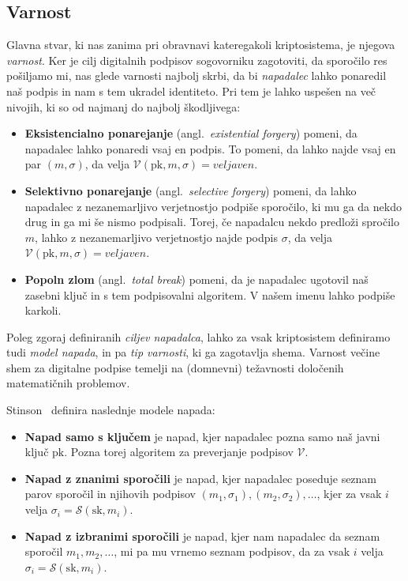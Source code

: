 \documentclass[isrm2, tisk]{fmfdelo}
\begin{document}
\subsection{Varnost}
\label{sec:varnost}
Glavna stvar, ki nas zanima pri obravnavi kateregakoli kriptosistema, je njegova \textit{varnost}. 
Ker je cilj digitalnih podpisov sogovorniku zagotoviti, da sporočilo res pošiljamo mi, nas glede 
varnosti najbolj skrbi, da bi \textit{napadalec} lahko ponaredil naš podpis in nam s tem ukradel 
identiteto. Pri tem je lahko uspešen na več nivojih, ki so od najmanj do najbolj škodljivega:

\begin{itemize}
    \item \textbf{Eksistencialno ponarejanje} (angl.\ \textit{existential forgery}) pomeni, da napadalec 
        lahko ponaredi vsaj en podpis. To pomeni, da lahko najde vsaj en par $(m, \sigma)$, da 
        velja $\mathcal{V}(\text{pk}, m, \sigma) = veljaven$.
    \item \textbf{Selektivno ponarejanje} (angl.\ \textit{selective forgery}) pomeni, da lahko napadalec 
        z nezanemarljivo verjetnostjo podpiše sporočilo, ki mu ga da nekdo drug in ga mi še nismo 
        podpisali. Torej, če napadalcu nekdo predloži spročilo $m$, lahko z nezanemarljivo verjetnostjo 
        najde podpis $\sigma$, da velja $\mathcal{V}(\text{pk}, m, \sigma) = veljaven$.
    \item \textbf{Popoln zlom} (angl.\ \textit{total break}) pomeni, da je napadalec ugotovil naš 
        zasebni ključ in s tem podpisovalni algoritem. V našem imenu lahko podpiše karkoli.
\end{itemize}

Poleg zgoraj definiranih \textit{ciljev napadalca}, lahko za vsak kriptosistem definiramo tudi
\textit{model napada}, in pa \textit{tip varnosti}, ki ga zagotavlja shema. Varnost večine shem za 
digitalne podpise temelji na (domnevni) težavnosti določenih matematičnih problemov.

Stinson~\cite{stinson2023crypto} definira naslednje modele napada:
\begin{itemize}
    \item \textbf{Napad samo s ključem} je napad, kjer napadalec pozna samo naš javni ključ $\text{pk}$. 
        Pozna torej algoritem za preverjanje podpisov $\mathcal{V}$.
    \item \textbf{Napad z znanimi sporočili} je napad, kjer napadalec poseduje seznam parov sporočil 
        in njihovih podpisov $(m_1, \sigma_1), (m_2, \sigma_2), \dots$, kjer za vsak $i$ velja 
        $\sigma_i = \mathcal{S}(\text{sk}, m_i)$.
    \item \textbf{Napad z izbranimi sporočili} je napad, kjer nam napadalec da seznam sporočil $m_1,
        m_2, \dots$, mi pa mu vrnemo seznam podpisov, da za vsak $i$ velja $\sigma_i = \mathcal{S}(\text{sk}, 
        m_i)$.
\end{itemize}
\end{document}
